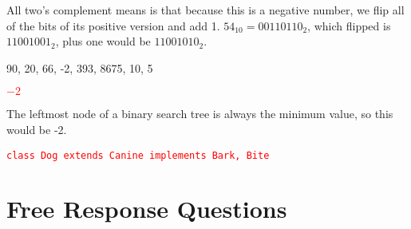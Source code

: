 \documentclass[11pt,addpoints]{exam}
\begin{document}
\begin{questions}
\begin{minipage}{\textwidth}
  All two's complement means is that because this is a negative number, we flip all of the bits of its positive version and add 1. $54_{10} = 00110110_{2}$, which flipped is $11001001_{2}$, plus one would be $11001010_{2}$. \\

\end{minipage}

\begin{minipage}{\textwidth}

90, 20, 66, -2, 393, 8675, 10, 5 \\

\begin{choices}
  \choice \textcolor{red}{$-2$}
   \\
\end{choices}

The leftmost node of a binary search tree is always the minimum value, so this would be -2. \\

\end{minipage}


\begin{minipage}{\textwidth}

\begin{choices}
  \choice \textcolor{red}{\tt class Dog extends Canine implements Bark, Bite}
   \\
\end{choices}

\end{minipage}

\newpage

\section{Free Response Questions}


\end{questions}
\end{document}
